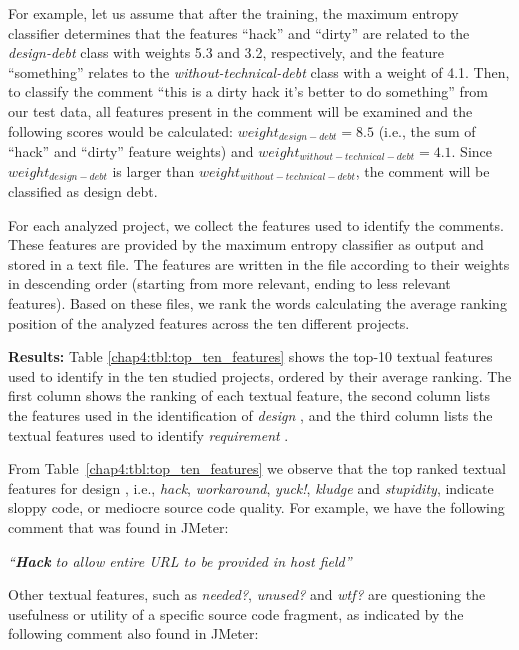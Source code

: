 For example, let us assume that after the training, the maximum entropy classifier determines that the features ``hack'' and ``dirty'' are related to the \textit{design-debt} class with weights 5.3 and 3.2, respectively, and the feature ``something'' relates to the \textit{without-technical-debt} class with a weight of 4.1. Then, to classify the comment ``this is a dirty hack it's better to do something'' from our test data, all features present in the comment will be examined and the following scores would be calculated: $weight_{design-debt}=8.5$ (i.e., the sum of ``hack'' and ``dirty'' feature weights) and  $weight_{without-technical-debt}=4.1$.
Since $weight_{design-debt}$ is larger than $weight_{without-technical-debt}$, the comment will be classified as design debt.

For each analyzed project, we collect the features used to identify the \SATD comments. These features are provided by the maximum entropy classifier as output and stored in a text file. The features are written in the file according to their weights in descending order (starting from more relevant, ending to less relevant features). Based on these files, we rank the words calculating the average ranking position of the analyzed features across the ten different projects. 

\noindent \textbf{Results:} Table \ref{chap4:tbl:top_ten_features} shows the top-10 textual features used to identify  \SATD in the ten studied projects, ordered by their average ranking. The first column shows the ranking of each textual feature, the second column lists the features used in the identification of \emph{design} \SATD, and the third column lists the textual features used to identify \emph{requirement} \SATD.

From Table~\ref{chap4:tbl:top_ten_features} we observe that the top ranked textual features for design \SATD, i.e., \textit{hack}, \textit{workaround}, \textit{yuck!}, \textit{kludge} and \textit{stupidity}, indicate sloppy code, or mediocre source code quality. For example, we have the following comment that was found in JMeter:

\vspace{1mm}
\begin{displayquote}
\textit{``\textbf{Hack} to allow entire URL to be provided in host field''}
\end{displayquote}
\vspace{1mm}

Other textual features, such as \textit{needed?}, \textit{unused?} and \textit{wtf?} are questioning the usefulness or utility of a specific source code fragment, as indicated by the following comment also found in JMeter:

